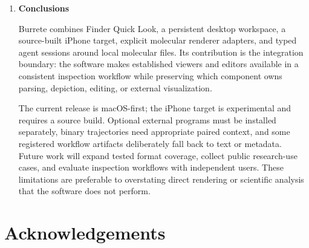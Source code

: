 \documentclass[preprint,12pt,a4paper]{elsarticle}
\begin{document}
\begin{enumerate}
The typed session boundary also creates a reproducible point of contact for
AI-assisted research software. An agent can query explicit document and viewer
state and invoke a limited action contract instead of inferring all state from
pixels. This enables research questions around auditable human--agent
inspection, cross-surface consistency, and bounded context for molecular
workflows without positioning the agent as an autonomous scientific
decision-maker.

The project is at an early adoption stage. On 10 July 2026, the public
repository reported 17 GitHub stars and 148 downloads of binary release assets
across releases; these are download events rather than unique-user counts
\cite{burrete}. The author is not aware of a peer-reviewed study that has yet
used Burrete as a research method, so no publication-impact claim is made.
Instead, the repository supplies source, published macOS release artifacts,
sample files, documentation, and contract tests so that prospective users and
reviewers can inspect the implementation and reproduce the illustrated
workflows.

\item \textbf{Conclusions}

Burrete combines Finder Quick Look, a persistent desktop workspace, a
source-built iPhone target, explicit molecular renderer adapters, and typed
agent sessions around local molecular files. Its contribution is the
integration boundary: the software makes established viewers and editors
available in a consistent inspection workflow while preserving which component
owns parsing, depiction, editing, or external visualization.

The current release is macOS-first; the iPhone target is experimental and
requires a source build. Optional external programs must be installed
separately, binary trajectories need appropriate paired context, and some
registered workflow artifacts deliberately fall back to text or metadata.
Future work will expand tested format coverage, collect public research-use
cases, and evaluate inspection workflows with independent users. These
limitations are preferable to overstating direct rendering or scientific
analysis that the software does not perform.

\end{enumerate}

\section*{Acknowledgements}
\end{document}
